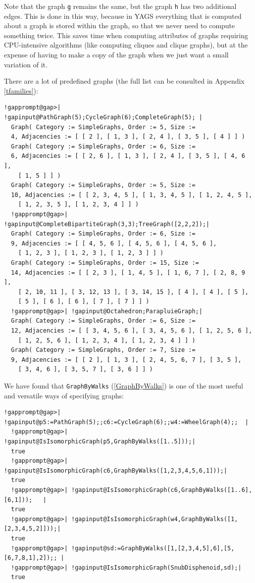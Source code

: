 \documentclass[a4paper,11pt]{report}
\begin{document}
{{Note that the graph \texttt{g} remains the same, but the graph \texttt{h} has two additional edges. This is done in this way, because in \textsf{YAGS} everything that is computed about a graph is stored within the graph, so that
we never need to compute something twice. This saves time when computing
attributes of graphs requiring CPU-intensive algorithms (like computing
cliques and clique graphs), but at the expense of having to make a copy of the
graph when we just want a small variation of it. 

 There are a lot of predefined graphs (the full list can be consulted in
Appendix \ref{tfamilies}): 

 
\begin{Verbatim}[commandchars=!@|,fontsize=\small,frame=single,label=Example]
  !gapprompt@gap>| !gapinput@PathGraph(5);CycleGraph(6);CompleteGraph(5); |
  Graph( Category := SimpleGraphs, Order := 5, Size := 
  4, Adjacencies := [ [ 2 ], [ 1, 3 ], [ 2, 4 ], [ 3, 5 ], [ 4 ] ] )
  Graph( Category := SimpleGraphs, Order := 6, Size := 
  6, Adjacencies := [ [ 2, 6 ], [ 1, 3 ], [ 2, 4 ], [ 3, 5 ], [ 4, 6 ], 
    [ 1, 5 ] ] )
  Graph( Category := SimpleGraphs, Order := 5, Size := 
  10, Adjacencies := [ [ 2, 3, 4, 5 ], [ 1, 3, 4, 5 ], [ 1, 2, 4, 5 ], 
    [ 1, 2, 3, 5 ], [ 1, 2, 3, 4 ] ] )
  !gapprompt@gap>| !gapinput@CompleteBipartiteGraph(3,3);TreeGraph([2,2,2]);|
  Graph( Category := SimpleGraphs, Order := 6, Size := 
  9, Adjacencies := [ [ 4, 5, 6 ], [ 4, 5, 6 ], [ 4, 5, 6 ], 
    [ 1, 2, 3 ], [ 1, 2, 3 ], [ 1, 2, 3 ] ] )
  Graph( Category := SimpleGraphs, Order := 15, Size := 
  14, Adjacencies := [ [ 2, 3 ], [ 1, 4, 5 ], [ 1, 6, 7 ], [ 2, 8, 9 ], 
    [ 2, 10, 11 ], [ 3, 12, 13 ], [ 3, 14, 15 ], [ 4 ], [ 4 ], [ 5 ], 
    [ 5 ], [ 6 ], [ 6 ], [ 7 ], [ 7 ] ] )
  !gapprompt@gap>| !gapinput@Octahedron;ParapluieGraph;|
  Graph( Category := SimpleGraphs, Order := 6, Size := 
  12, Adjacencies := [ [ 3, 4, 5, 6 ], [ 3, 4, 5, 6 ], [ 1, 2, 5, 6 ], 
    [ 1, 2, 5, 6 ], [ 1, 2, 3, 4 ], [ 1, 2, 3, 4 ] ] )
  Graph( Category := SimpleGraphs, Order := 7, Size := 
  9, Adjacencies := [ [ 2 ], [ 1, 3 ], [ 2, 4, 5, 6, 7 ], [ 3, 5 ], 
    [ 3, 4, 6 ], [ 3, 5, 7 ], [ 3, 6 ] ] )
\end{Verbatim}
 

We have found that \texttt{GraphByWalks} (\ref{GraphByWalks}) is one of the most useful and versatile ways of specifying graphs: 

 
\begin{Verbatim}[commandchars=!@|,fontsize=\small,frame=single,label=Example]
  !gapprompt@gap>| !gapinput@p5:=PathGraph(5);;c6:=CycleGraph(6);;w4:=WheelGraph(4);;  |
  !gapprompt@gap>| !gapinput@IsIsomorphicGraph(p5,GraphByWalks([1..5]));|
  true
  !gapprompt@gap>| !gapinput@IsIsomorphicGraph(c6,GraphByWalks([1,2,3,4,5,6,1]));|
  true
  !gapprompt@gap>| !gapinput@IsIsomorphicGraph(c6,GraphByWalks([1..6],[6,1]));   |
  true
  !gapprompt@gap>| !gapinput@IsIsomorphicGraph(w4,GraphByWalks([1,[2,3,4,5,2]]));|
  true
  !gapprompt@gap>| !gapinput@sd:=GraphByWalks([1,[2,3,4,5],6],[5,[6,7,8,1],2]);; |
  !gapprompt@gap>| !gapinput@IsIsomorphicGraph(SnubDisphenoid,sd);|
  true
\end{Verbatim}
 

}}
\end{document}
